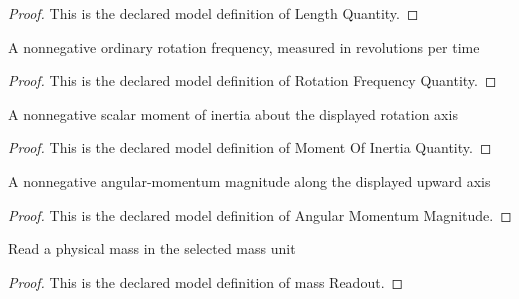 \begin{proof}
  This is the declared model definition of Length Quantity.
\end{proof}
\begin{definition}
  \label{def:physics:phyx-mini-0711:phyxminiproblems-problemphyxmini0711-rotationfrequencyquantity}
  A nonnegative ordinary rotation frequency, measured in revolutions per time
\end{definition}
\begin{proof}
  This is the declared model definition of Rotation Frequency Quantity.
\end{proof}
\begin{definition}
  \label{def:physics:phyx-mini-0711:phyxminiproblems-problemphyxmini0711-momentofinertiaquantity}
  A nonnegative scalar moment of inertia about the displayed rotation axis
\end{definition}
\begin{proof}
  This is the declared model definition of Moment Of Inertia Quantity.
\end{proof}
\begin{definition}
  \label{def:physics:phyx-mini-0711:phyxminiproblems-problemphyxmini0711-angularmomentummagnitude}
  A nonnegative angular-momentum magnitude along the displayed upward axis
\end{definition}
\begin{proof}
  This is the declared model definition of Angular Momentum Magnitude.
\end{proof}
\begin{definition}
  \label{def:physics:phyx-mini-0711:phyxminiproblems-problemphyxmini0711-massreadout}
  Read a physical mass in the selected mass unit
\end{definition}
\begin{proof}
  This is the declared model definition of mass Readout.
\end{proof}
